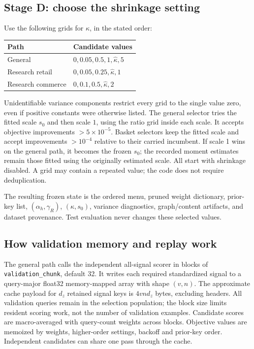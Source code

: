 \documentclass[11pt,a4paper]{article}
\newcommand{\code}[1]{\nolinkurl{#1}}
\numberwithin{equation}{section}
\begin{document}
\subsection{Stage D: choose the shrinkage setting}
Use the following grids for $\kappa$, in the stated order:
\begin{center}\small
\begin{tabular}{@{}ll@{}}
\toprule Path & Candidate values \\\midrule
General & $0,0.05,0.5,1,\widehat\kappa,5$ \\
Research retail & $0,0.05,0.25,\widehat\kappa,1$ \\
Research commerce & $0,0.1,0.5,\widehat\kappa,2$ \\
\bottomrule
\end{tabular}
\end{center}
Unidentifiable variance components restrict every grid to the single value zero, even if
positive constants were otherwise listed. The general selector tries the fitted scale
$s_0$ and then scale $1$, using the ratio grid inside each scale. It accepts objective
improvements $>5\times10^{-5}$. Basket selectors keep the fitted scale and accept
improvements $>10^{-4}$ relative to their carried incumbent. If scale 1 wins on the general path, it becomes the frozen $s_0$; the recorded moment
estimates remain those fitted using the originally estimated scale. All start with shrinkage
disabled. A grid may contain a repeated value; the code does not require deduplication.

The resulting frozen state is the ordered menu, pruned weight dictionary, prior-key list,
$(\alpha_h,\gamma_R)$, $(\kappa,s_0)$, variance diagnostics, graph/content artifacts,
and dataset provenance. Test evaluation never changes these selected values.

\subsection{How validation memory and replay work}
The general path calls the independent all-signal scorer in blocks of
\code{validation_chunk}, default 32. It writes each required standardized signal to a
query-major float32 memory-mapped array with shape $(v,n)$. The approximate cache payload
for $d_z$ retained signal keys is $4vnd_z$ bytes, excluding headers. All validation queries
remain in the selection population; the block size limits resident scoring work, not the
number of validation examples. Candidate scores are macro-averaged with query-count
weights across blocks. Objective values are memoized by weights, higher-order settings,
backoff and prior-key order. Independent candidates can share one pass through the cache.
\end{document}
